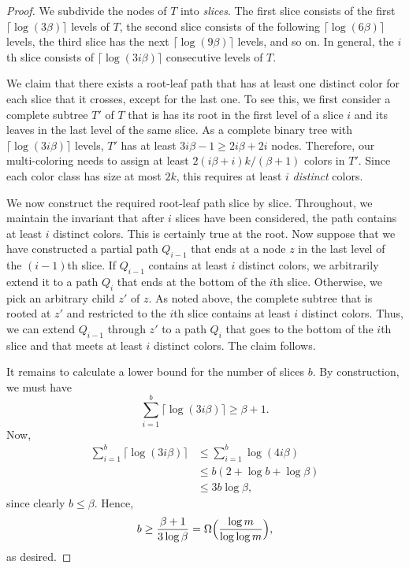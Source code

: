\documentclass{paper}
\begin{document}
\begin{proof}
We subdivide the nodes of $T$ into \emph{slices}. 
The first slice consists of the first $\lceil\log(3\beta)\rceil$ 
levels of $T$, 
the second slice consists of the following  $\lceil \log (6 \beta)\rceil$
levels, the third slice has the next $\lceil \log(9 \beta)\rceil$ levels,
and so on. In general, the $i$th slice consists of 
$\lceil \log (3i \beta)\rceil$ consecutive levels of $T$. 

We claim that there
exists a root-leaf path that has at least one distinct color 
for each slice that it crosses, except for the last one. 
To see this, we first consider a complete subtree $T'$ of $T$ that is
has its root in the first level of a slice $i$ and its
leaves in the last level of the same slice. As a complete
binary tree with $\lceil \log (3i \beta)\rceil$ levels, $T'$ has at least  
$3i \beta - 1 \geq 2i\beta + 2i$ nodes. Therefore, our 
multi-coloring needs to assign at least $2(i\beta +i)k/(\beta + 1)$ colors
in $T'$. Since each color class has size at most
$2k$, this requires at least
$i$ \emph{distinct} colors.

We now construct the required root-leaf path slice by slice.
Throughout, we maintain the invariant that after
$i$ slices have been considered, the path contains at least
$i$ distinct colors. This is certainly true at the root.
Now suppose that we have constructed a partial path $Q_{i-1}$ that  
ends at a node $z$ in the last level of the $(i-1)$th slice. If $Q_{i-1}$
contains at least $i$ distinct colors, we arbitrarily extend it
to a path $Q_{i}$ that ends at the bottom of the $i$th slice.
Otherwise, we pick an arbitrary child $z'$ of $z$. 
As noted above, the complete subtree that is rooted at $z'$ and restricted
to the $i$th slice contains at least $i$ distinct colors. Thus,
we can extend $Q_{i-1}$ through $z'$ to a path $Q_i$ that goes to
the bottom of the $i$th slice and that meets at least $i$ distinct colors.
The claim follows. 

It remains to calculate a lower bound for the number of slices $b$.
By construction, we must have
\[
  \sum_{i=1}^b \lceil \log (3i \beta)\rceil \geq \beta + 1.
\]
Now,
\begin{align*}
  \sum_{i=1}^b \lceil \log (3i \beta)\rceil &\leq
  \sum_{i=1}^b \log (4i \beta)\\
  &\leq b (2 + \log b + \log \beta)\\
  & \leq 3b \log\beta,
\end{align*}
since clearly $b \leq \beta$.
Hence, 
\[
b \geq \frac{\beta +1}{3\log\beta} = 
\Omega\Bigl(\frac{\log m}{\log\log m}\Bigr),
\]
as desired.
\end{proof}
\end{document}
